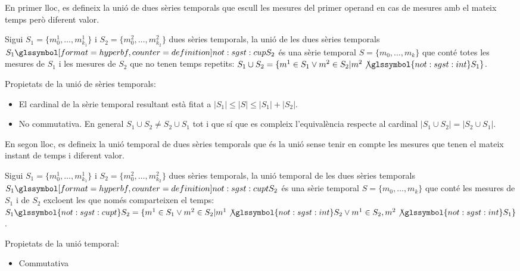 En primer lloc, es defineix la unió de dues sèries temporals que
escull les mesures del primer operand en cas de mesures amb el mateix
temps però diferent valor.
\begin{definition}[unió]
  Sigui $S_1=\{m_0^1, \dotsc, m_{k_1}^1\}$ i $S_2=\{m_0^2, \dotsc,
  m_{k_2}^2\}$ dues sèries temporals, la unió de les dues sèries
  temporals $S_1 \glssymboldef{not:sgst:cup} S_2$ és una sèrie
  temporal $S=\{m_0, \dotsc, m_k\}$ que conté totes les mesures de
  $S_1$ i les mesures de $S_2$ que no tenen temps repetits: $S_1 \cup
  S_2 = \{m^1 \in S_1 \vee m^2 \in S_2 | m^2
  \not\glssymbol{not:sgst:int} S_1 \}$.
\end{definition}

Propietats de la unió de sèries temporals:
\begin{itemize}
\item El cardinal de la sèrie temporal resultant està fitat a
  $|S_1| \leq |S| \leq |S_1| + |S_2|$. 
\item No commutativa. En general
  $S_1\cup S_2 \neq S_2\cup S_1$ tot i que sí que es compleix
  l'equivalència respecte al cardinal $|S_1 \cup S_2| = |S_2\cup S_1|$.
\end{itemize}

En segon lloc, es defineix la unió temporal de dues sèries temporals
que és la unió sense tenir en compte les mesures que tenen el mateix
instant de temps i diferent valor.
\begin{definition}
  Sigui $S_1=\{m_0^1, \dotsc, m_{k_1}^1\}$ i $S_2=\{m_0^2, \dotsc,
  m_{k_2}^2\}$ dues sèries temporals, la unió temporal de les dues
  sèries temporals $S_1 \glssymboldef{not:sgst:cupt} S_2$ és una sèrie
  temporal $S=\{m_0, \dotsc, m_k\}$ que conté les mesures de $S_1$ i
  de $S_2$ excloent les que només comparteixen el temps: $S_1
  \glssymbol{not:sgst:cupt} S_2 = \{ m^1 \in S_1 \vee m^2 \in S_2 |
  m^1 \not\glssymbol{not:sgst:int} S_2 \vee m^1 \in S_2, m^2
  \not\glssymbol{not:sgst:int} S_1 \}$.
\end{definition}


Propietats de la unió temporal:
\begin{itemize}
\item Commutativa
\end{itemize}




